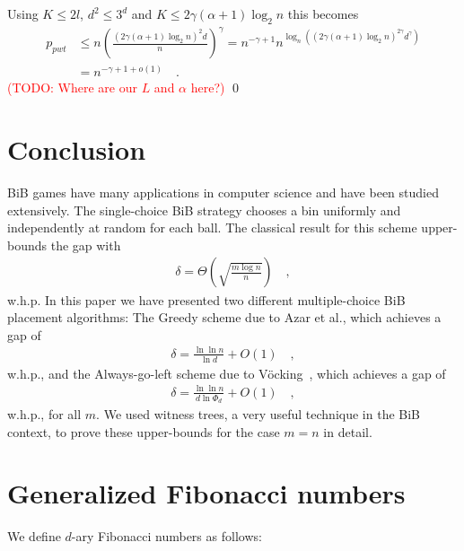 \documentclass[a4paper,12pt]{article}
\newcommand\todo[1]{\textcolor{red}{(TODO: #1)}}
\begin{document}
Using $K \leq 2l$, $d^2 \leq 3^d$ and $K \leq 2\gamma  \left( \alpha +1 \right)  \log_2 n$ this becomes
\begin{align*}
p_{pwt} &\leq n \left(\frac{\left(2\gamma  \left(\alpha +1 \right)  \log_2 n\right)^2 d}{n}\right)^\gamma 
        = n^{-\gamma +1}  n ^{\log_n\left( \left(2\gamma \left(\alpha+1\right) \log_2n \right)^{2\gamma}  d^\gamma \right)} \\
        &= n^{-\gamma+1+o\left(1\right)} \quad .
\end{align*}
\todo{Where are our $L$ and $\alpha$ here?}
\qed
 
\section{Conclusion}
\label{sec:conclusion}
BiB games have many applications in computer science and have been studied extensively. The single-choice BiB strategy chooses a bin uniformly and independently at random for each ball. The classical result for this scheme upper-bounds the gap with~\cite{RS98}
\begin{align*}
\delta =  \Theta\left(\sqrt{\frac{m  \log n}{n}}\right) \quad ,
\end{align*}
w.h.p.
In this paper we have presented two different multiple-choice BiB placement algorithms: The Greedy scheme due to Azar et al.\cite{ABKU99}, which achieves a gap of 
\begin{align*}
\delta = \frac{\ln\ln n}{\ln d} + O(1) \quad ,
\end{align*}
w.h.p., and the Always-go-left scheme due to V\"ocking~\cite{VOC03}, which achieves a gap of
\begin{align*}
\delta = \frac{\ln \ln n}{d \ln \Phi_d} + O(1) \quad ,
\end{align*}
w.h.p., for all $m$. We used witness trees, a very useful technique in the BiB context, to prove these upper-bounds for the case $m=n$ in detail.

\appendix
\section{Generalized Fibonacci numbers}
\label{sec:fibonacci}
We define $d$-ary Fibonacci numbers as follows:
\end{document}
